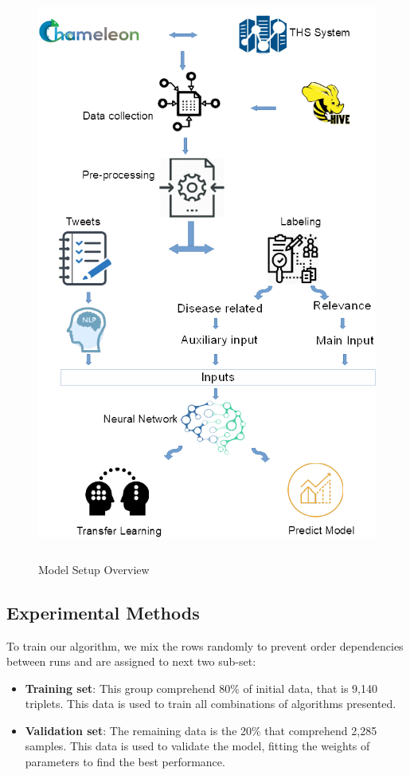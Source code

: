 \documentclass[12pt]{report}
\begin{document}
\begin{figure}[H]	
	\centering
	\includegraphics[height=190mm,  scale = 0.8]{images/10_architecture_setup.png}	
	\caption{Model Setup Overview}	
	\label{figure:model_setup}
\end{figure}

\subsection{Experimental Methods} \label{experimental_methods}

To train our algorithm, we mix the rows randomly to prevent order dependencies between runs and are assigned to next two sub-set:

\begin{itemize}[nolistsep]
	\item \textbf{Training set}: This group comprehend 80\% of initial data, that is 9,140 triplets. This data is used to train all combinations of algorithms presented.
	\item \textbf{Validation set}:  The remaining data is the 20\% that comprehend 2,285 samples. This data is used to validate the model, fitting the weights of parameters to find the best performance.
\end{itemize}
\end{document}
